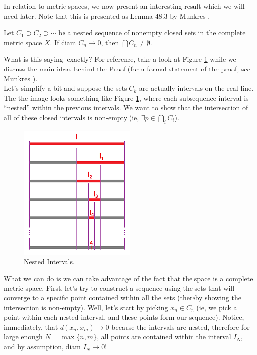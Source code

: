 \documentclass[english, 11pt]{article}
\begin{document}
  In relation to metric spaces, we now present an interesting result which we will need later. Note that this is presented as Lemma 48.3 by Munkres \cite{topology_book}.

  \begin{lem}
    \label{lem:nested_sequence}
    Let $C_1 \supset C_2 \supset \cdots$ be a nested sequence of nonempty closed sets in the complete metric space $X$. If diam $C_n \to 0$, then $\bigcap C_n \neq \emptyset$.
  \end{lem}

  What is this saying, exactly? For reference, take a look at Figure \ref{fig:nested} while we discuss the main ideas behind the Proof (for a formal statement of the proof, see Munkres \cite{topology_book}).\\

  Let's simplify a bit and suppose the sets $C_k$ are actually intervals on the real line. The the image looks something like Figure \ref{fig:nested}, where each subsequence interval is ``nested'' within the previous intervals. We want to show that the intersection of all of these closed intervals is non-empty (ie, $\exists p \in \bigcap_i C_i$).\\

  \begin{figure}
  \centering
  \includegraphics[scale=0.7]{nested.png}
  \caption{Nested Intervals.}
  \label{fig:nested}
  \end{figure}

  What we can do is we can take advantage of the fact that the space is a complete metric space. First, let's try to construct a sequence using the sets that will converge to a specific point contained within all the sets (thereby showing the intersection is non-empty). Well, let's start by picking $x_n \in C_n$ (ie, we pick a point within each nested interval, and these points form our sequence). Notice, immediately, that $d(x_n,x_m) \to 0$ because the intervals are nested, therefore for large enough $N=\max\{n,m\}$, all points are contained within the interval $I_N$, and by assumption, diam $I_N \to 0$! \\
\end{document}
